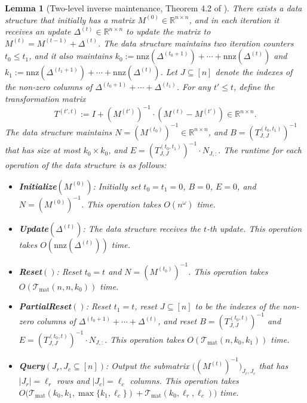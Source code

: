 \documentclass[11pt]{article}
\newtheorem{lemma}[theorem]{Lemma}
\newcommand{\Tmat}{\mathcal{T}_{\mathrm{mat}}}
\newcommand{\nnz}{\mathrm{nnz}}
\newcommand\BB{\boldsymbol{\mathit{B}}}
\newcommand\EE{\boldsymbol{\mathit{E}}}
\newcommand\II{\boldsymbol{\mathit{I}}}
\newcommand\NN{\boldsymbol{\mathit{N}}}
\newcommand\MM{\boldsymbol{\mathit{M}}}
\newcommand\TT{\boldsymbol{\mathit{T}}}
\newcommand\R{\mathbb{R}}
\begin{document}
\begin{lemma}[Two-level inverse maintenance, Theorem 4.2 of \cite{bns19}]
\label{lem:InverseMaintenanceTwoLevel}
There exists a data structure that initially has a matrix $\MM^{(0)} \in \R^{n \times n}$, and in each iteration it receives an update $\Delta^{(t)} \in \R^{n \times n}$ to update the matrix to $\MM^{(t)} = \MM^{(t-1)} + \Delta^{(t)}$. The data structure maintains two iteration counters $t_0 \leq t_1$, and it also maintains $k_0 := \nnz(\Delta^{(t_0+1)}) + \cdots + \nnz(\Delta^{(t)})$ and $k_1 := \nnz(\Delta^{(t_1+1)}) + \cdots + \nnz(\Delta^{(t)})$. Let $J \subseteq [n]$ denote the indexes of the non-zero columns of $\Delta^{(t_0+1)} + \cdots + \Delta^{(t_1)}$. For any $t' \leq t$, define the transformation matrix
\[
\TT^{(t',t)} := \II + (\MM^{(t')})^{-1} \cdot (\MM^{(t)} - \MM^{(t')}) \in \R^{n \times n}.
\]
The data structure maintains $\NN = (\MM^{(t_0)})^{-1} \in \R^{n \times n}$, and $\BB = (\TT^{(t_0,t_1)}_{J,J})^{-1}$ that has size at most $k_0 \times k_0$, and $\EE = (\TT^{(t_0,t_1)}_{J,J})^{-1} \cdot \NN_{J,:}$. The runtime for each operation of the data structure is as follows:
\begin{itemize}
\item {\bf Initialize$(\MM^{(0)})$}: Initially set $t_0 = t_1 = 0$, $\BB = 0$, $\EE = 0$, and $\NN = (\MM^{(0)})^{-1}$. This operation takes $O(n^{\omega})$ time.
\item {\bf Update$(\Delta^{(t)})$}: The data structure receives the $t$-th update. This operation takes $O(\nnz(\Delta^{(t)}))$ time.
\item {\bf Reset$()$}: Reset $t_0 = t$ and $\NN = (\MM^{(t_0)})^{-1}$.  This operation takes $O(\Tmat(n, n, k_0))$ time.
\item {\bf PartialReset$()$}: Reset $t_1 = t$, reset $J \subseteq [n]$ to be the indexes of the non-zero columns of $\Delta^{(t_0+1)}+ \cdots + \Delta^{(t)}$, and reset $\BB = (\TT^{(t_0,t)}_{J,J})^{-1}$ and $\EE = (\TT^{(t_0,t)}_{J,J})^{-1} \cdot \NN_{J,:}$. This operation takes $O(\Tmat(n, k_0, k_1))$ time.

\item {\bf Query$(J_r, J_c \subseteq [n])$}: Output the submatrix $\big((\MM^{(t)})^{-1} \big)_{J_r, J_c}$ that has $|J_r| = \ell_r$ rows and $|J_c| = \ell_c$ columns. This operation takes $O\big(\Tmat(k_0, k_1, \max\{k_1,\ell_c\}) + \Tmat(k_0, \ell_r, \ell_c)\big)$ time.
\end{itemize}
\end{lemma}
\end{document}
